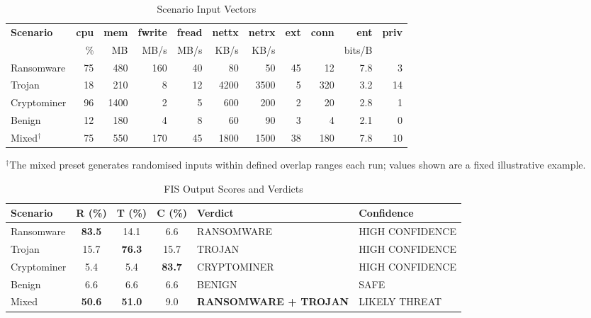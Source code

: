 \documentclass[conference]{IEEEtran}
\begin{document}
\begin{table}[!t]
\centering
\caption{Scenario Input Vectors}
\label{tab:inputs_all}
\renewcommand{\arraystretch}{1.2}
\small\setlength{\tabcolsep}{4pt}
\begin{tabular}{@{} l r r r r r r r r r r @{}}
\toprule
\textbf{Scenario} & \textbf{cpu} & \textbf{mem} & \textbf{fwrite} & \textbf{fread} & \textbf{nettx} & \textbf{netrx} & \textbf{ext} & \textbf{conn} & \textbf{ent} & \textbf{priv} \\
 & \% & MB & MB/s & MB/s & KB/s & KB/s & & & bits/B & \\
\midrule
Ransomware  & 75 & 480  & 160 & 40 & 80   & 50   & 45 & 12  & 7.8 & 3  \\
Trojan      & 18 & 210  & 8   & 12 & 4200 & 3500 & 5  & 320 & 3.2 & 14 \\
Cryptominer & 96 & 1400 & 2   & 5  & 600  & 200  & 2  & 20  & 2.8 & 1  \\
Benign      & 12 & 180  & 4   & 8  & 60   & 90   & 3  & 4   & 2.1 & 0  \\
Mixed$^{\dagger}$ & 75 & 550 & 170 & 45 & 1800 & 1500 & 38 & 180 & 7.8 & 10 \\
\bottomrule
\end{tabular}

\smallskip
{\footnotesize $^{\dagger}$The mixed preset generates
  randomised inputs within defined overlap ranges each run; values shown
  are a fixed illustrative example.}
\end{table}

\begin{table}[!t]
\centering
\caption{FIS Output Scores and Verdicts}
\label{tab:output_scores}
\small\renewcommand{\arraystretch}{1.25}
\setlength{\tabcolsep}{5pt}
\begin{tabular}{@{} l c c c p{4.2cm} p{3.4cm} @{}}
\toprule
\textbf{Scenario} & \textbf{R (\%)} & \textbf{T (\%)} & \textbf{C (\%)} &
\textbf{Verdict} & \textbf{Confidence} \\
\midrule
Ransomware  & \textbf{83.5} & 14.1 &  6.6 & RANSOMWARE            & HIGH CONFIDENCE \\
Trojan      & 15.7 & \textbf{76.3} & 15.7 & TROJAN                & HIGH CONFIDENCE \\
Cryptominer &  5.4 &  5.4 & \textbf{83.7} & CRYPTOMINER           & HIGH CONFIDENCE \\
Benign      &  6.6 &  6.6 &  6.6          & BENIGN                & SAFE \\
Mixed       & \textbf{50.6} & \textbf{51.0} & 9.0 &
    \textbf{RANSOMWARE + TROJAN} & LIKELY THREAT \\
\bottomrule
\end{tabular}
\end{table}
\end{document}
